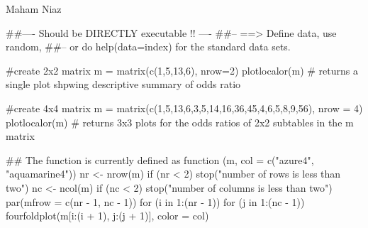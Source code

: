 \documentclass[letterpaper]{book}
\begin{document}
%
\begin{Author}\relax
Maham Niaz
\end{Author}
%
\begin{Examples}
\begin{ExampleCode}
##---- Should be DIRECTLY executable !! ----
##-- ==>  Define data, use random,
##--	or do  help(data=index)  for the standard data sets.

  #create 2x2 matrix
  m = matrix(c(1,5,13,6), nrow=2)
  plotlocalor(m) # returns a single plot shpwing descriptive summary of odds ratio
  
  #create 4x4 matrix
  m = matrix(c(1,5,13,6,3,5,14,16,36,45,4,6,5,8,9,56), nrow = 4)
  plotlocalor(m) # returns 3x3 plots for the odds ratios of 2x2 subtables in the m matrix
  
## The function is currently defined as
function (m, col = c("azure4", "aquamarine4")) 
{
    nr <- nrow(m)
    if (nr < 2) 
        stop("number of rows is less than two")
    nc <- ncol(m)
    if (nc < 2) 
        stop("number of columns is less than two")
    par(mfrow = c(nr - 1, nc - 1))
    for (i in 1:(nr - 1)) for (j in 1:(nc - 1)) {
        fourfoldplot(m[i:(i + 1), j:(j + 1)], color = col)
    }
  }
\end{ExampleCode}
\end{Examples}
\printindex{}
\end{document}
